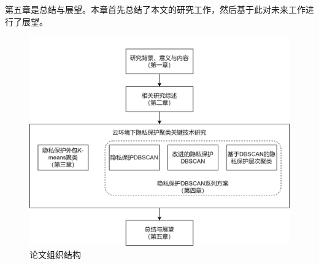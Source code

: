 第五章是总结与展望。本章首先总结了本文的研究工作，然后基于此对未来工作进行了展望。

\begin{figure}[htbp]
	\centering
	\includegraphics[scale=0.9]{img/dd.png}%
	\caption{论文组织结构}
	\label{lunwenjiegou}
\end{figure}